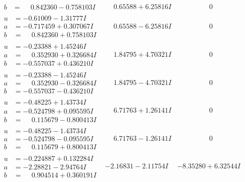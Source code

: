 \documentclass[1p]{elsarticle_modified}
\theoremstyle{definition}
\begin{document}
$$\begin{array}{c|c|c}
\begin{aligned}
b &= \phantom{-}0.842360 - 0.758103 I\end{aligned}
 & \phantom{-}0.65588 + 6.25816 I & \phantom{-0.000000 } 0 \\ \hline\begin{aligned}
u &= -0.61009 - 1.31777 I \\
a &= -0.717459 + 0.307067 I \\
b &= \phantom{-}0.842360 + 0.758103 I\end{aligned}
 & \phantom{-}0.65588 - 6.25816 I & \phantom{-0.000000 } 0 \\ \hline\begin{aligned}
u &= -0.23388 + 1.45246 I \\
a &= \phantom{-}0.352930 + 0.326684 I \\
b &= -0.557037 + 0.436210 I\end{aligned}
 & \phantom{-}1.84795 + 4.70321 I & \phantom{-0.000000 } 0 \\ \hline\begin{aligned}
u &= -0.23388 - 1.45246 I \\
a &= \phantom{-}0.352930 - 0.326684 I \\
b &= -0.557037 - 0.436210 I\end{aligned}
 & \phantom{-}1.84795 - 4.70321 I & \phantom{-0.000000 } 0 \\ \hline\begin{aligned}
u &= -0.48225 + 1.43734 I \\
a &= -0.524798 + 0.095595 I \\
b &= \phantom{-}0.115679 - 0.800413 I\end{aligned}
 & \phantom{-}6.71763 + 1.26141 I & \phantom{-0.000000 } 0 \\ \hline\begin{aligned}
u &= -0.48225 - 1.43734 I \\
a &= -0.524798 - 0.095595 I \\
b &= \phantom{-}0.115679 + 0.800413 I\end{aligned}
 & \phantom{-}6.71763 - 1.26141 I & \phantom{-0.000000 } 0 \\ \hline\begin{aligned}
u &= -0.224887 + 0.132284 I \\
a &= -2.28821 - 2.94764 I \\
b &= \phantom{-}0.904514 + 0.360191 I\end{aligned}
 & -2.16831 - 2.11754 I & -8.35280 + 6.32544 I \\ \hline\begin{aligned}

\end{aligned}
\end{array}$$
\end{document}
